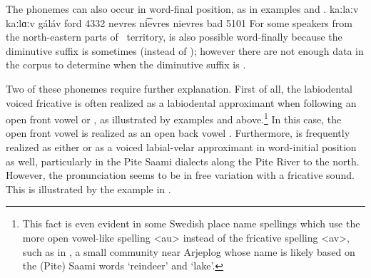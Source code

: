 The phonemes  can also occur in word-final position, as in examples  and .%
	{kaːlaː{v}}	{kaːlɑː{v}}	{gáláv}	{ford\BS{}}	{4332}
		{nevre{s}}	{ni͡evre{s}}	{nievres}	{bad\Sc{}}	{5101}
For some speakers from the north-eastern parts of \PS\ territory,  is also possible word-finally because the diminutive suffix is sometimes (instead of ); however there are not enough data in the corpus to determine when the diminutive suffix is . 

Two of these phonemes require further explanation. First of all, the labiodental voiced fricative  is often realized as a labiodental approximant \ipa{[ʋ]} when following an open front vowel  or , as illustrated by examples  and  above.\footnote{This fact is even evident in some Swedish place name spellings which use the more open vowel-like spelling <au> instead of the fricative spelling <av>, such as in , a small community near Arjeplog whose name is likely based on the (Pite) Saami words  ‘reindeer’ and  ‘lake’.} %
In this case, the open front vowel is realized as an open back vowel \ipa{[ɑ]}. 
Furthermore,  is frequently realized as either \ipa{[ʋ]} or as a voiced labial-velar approximant \ipa{[w]} in word-initial position as well, particularly in the Pite Saami dialects along the Pite River to the north. However, the \ipa{[ʋ]} pronunciation seems to be in free variation with a fricative \ipa{[v]} sound. 
This is illustrated by the example in .%
\ea\label{cheeseNOMSG}
\z

